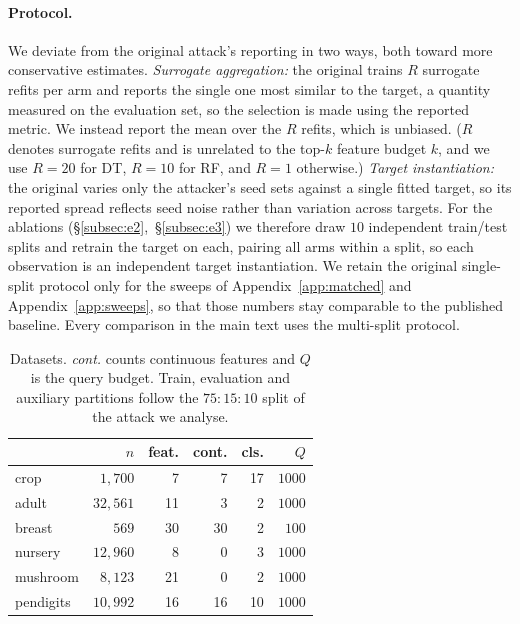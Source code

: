\documentclass[sigconf,anonymous,review]{acmart}
\begin{document}
\paragraph{Protocol.} We deviate from the original attack's reporting in two ways, both toward more
conservative estimates. \emph{Surrogate aggregation:} the original trains $R$ surrogate refits per
arm and reports the single one most similar to the target, a quantity measured on the evaluation set,
so the selection is made using the reported metric. We instead report the mean over the $R$ refits,
which is unbiased. ($R$ denotes surrogate refits and is unrelated to the top-$k$ feature budget $k$, and we use $R{=}20$ for DT, $R{=}10$ for RF, and $R{=}1$ otherwise.)
\emph{Target instantiation:} the original varies only the attacker's seed sets against a single fitted
target, so its reported spread reflects seed noise rather than variation across targets. For the
ablations (\S\ref{subsec:e2},~\S\ref{subsec:e3}) we therefore draw $10$ independent train/test splits
and retrain the target on each, pairing all arms within a split, so each observation is an independent
target instantiation. 
We retain the original single-split protocol only for the sweeps of
Appendix~\ref{app:matched} and Appendix~\ref{app:sweeps}, so that those numbers stay comparable to
the published baseline. Every comparison in the main text uses the multi-split protocol. 

\begin{table}[t]
\centering
\caption{Datasets. \emph{cont.} counts continuous features and $Q$ is the query budget. Train, evaluation
and auxiliary partitions follow the $75\!:\!15\!:\!10$ split of the attack we analyse.}
\label{tab:datasets}
\begin{tabular}{lrrrrr}
\toprule
 & $n$ & feat. & cont. & cls. & $Q$ \\
\midrule
crop      & $1{,}700$  & 7  & 7  & 17 & $1000$ \\
adult     & $32{,}561$ & 11 & 3  & 2  & $1000$ \\
breast    & $569$      & 30 & 30 & 2  & $100$  \\
nursery   & $12{,}960$ & 8  & 0  & 3  & $1000$ \\
mushroom  & $8{,}123$  & 21 & 0  & 2  & $1000$ \\
pendigits & $10{,}992$ & 16 & 16 & 10 & $1000$ \\
\bottomrule
\end{tabular}
\end{table}
\end{document}
